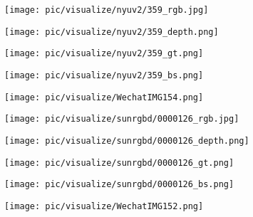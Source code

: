 \documentclass[10pt,twocolumn,letterpaper]{article}
\begin{document}
\begin{figure*}[t]
\begin{minipage}[c]{0.091\linewidth}
      \texttt{[image: pic/visualize/nyuv2/359\_rgb.jpg]}
   \end{minipage}
   \begin{minipage}[c]{0.091\linewidth}
      \texttt{[image: pic/visualize/nyuv2/359\_depth.png]}
   \end{minipage}
   \begin{minipage}[c]{0.091\linewidth}
      \texttt{[image: pic/visualize/nyuv2/359\_gt.png]}
   \end{minipage}
   \begin{minipage}[c]{0.091\linewidth}
      \texttt{[image: pic/visualize/nyuv2/359\_bs.png]}
   \end{minipage}
   \begin{minipage}[c]{0.091\linewidth}
      \texttt{[image: pic/visualize/WechatIMG154.png]}
   \end{minipage}\hspace{3pt}
   \begin{minipage}[c]{0.091\linewidth}
      \texttt{[image: pic/visualize/sunrgbd/0000126\_rgb.jpg]}
   \end{minipage}
   \begin{minipage}[c]{0.091\linewidth}
      \texttt{[image: pic/visualize/sunrgbd/0000126\_depth.png]}
   \end{minipage}
   \begin{minipage}[c]{0.091\linewidth}
      \texttt{[image: pic/visualize/sunrgbd/0000126\_gt.png]}
   \end{minipage}
   \begin{minipage}[c]{0.091\linewidth}
      \texttt{[image: pic/visualize/sunrgbd/0000126\_bs.png]}
   \end{minipage}
   \begin{minipage}[c]{0.091\linewidth}
      \texttt{[image: pic/visualize/WechatIMG152.png]}
   \end{minipage}



\end{figure*}
\end{document}
